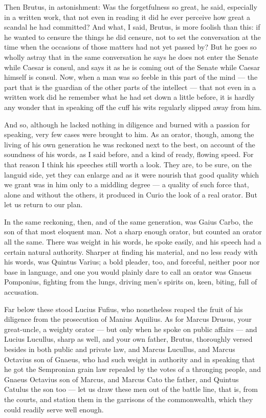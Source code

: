  Then Brutus, in astonishment: Was the forgetfulness so great, he said, especially in a written work, that not even in reading it did he ever perceive how great a scandal he had committed? And what, I said, Brutus, is more foolish than this: if he wanted to censure the things he did censure, not to set the conversation at the time when the occasions of those matters had not yet passed by? But he goes so wholly astray that in the same conversation he says he does not enter the Senate while Caesar is consul, and says it as he is coming out of the Senate while Caesar himself is consul. Now, when a man was so feeble in this part of the mind — the part that is the guardian of the other parts of the intellect — that not even in a written work did he remember what he had set down a little before, it is hardly any wonder that in speaking off the cuff his wits regularly slipped away from him.

 And so, although he lacked nothing in diligence and burned with a passion for speaking, very few cases were brought to him. As an orator, though, among the living of his own generation he was reckoned next to the best, on account of the soundness of his words, as I said before, and a kind of ready, flowing speed. For that reason I think his speeches still worth a look. They are, to be sure, on the languid side, yet they can enlarge and as it were nourish that good quality which we grant was in him only to a middling degree — a quality of such force that, alone and without the others, it produced in Curio the look of a real orator. But let us return to our plan.

 In the same reckoning, then, and of the same generation, was Gaius Carbo, the son of that most eloquent man. Not a sharp enough orator, but counted an orator all the same. There was weight in his words, he spoke easily, and his speech had a certain natural authority. Sharper at finding his material, and no less ready with his words, was Quintus Varius; a bold pleader, too, and forceful, neither poor nor base in language, and one you would plainly dare to call an orator was Gnaeus Pomponius, fighting from the lungs, driving men's spirits on, keen, biting, full of accusation.

 Far below these stood Lucius Fufius, who nonetheless reaped the fruit of his diligence from the prosecution of Manius Aquilius. As for Marcus Drusus, your great-uncle, a weighty orator — but only when he spoke on public affairs — and Lucius Lucullus, sharp as well, and your own father, Brutus, thoroughly versed besides in both public and private law, and Marcus Lucullus, and Marcus Octavius son of Gnaeus, who had such weight in authority and in speaking that he got the Sempronian grain law repealed by the votes of a thronging people, and Gnaeus Octavius son of Marcus, and Marcus Cato the father, and Quintus Catulus the son too — let us draw these men out of the battle line, that is, from the courts, and station them in the garrisons of the commonwealth, which they could readily serve well enough.

